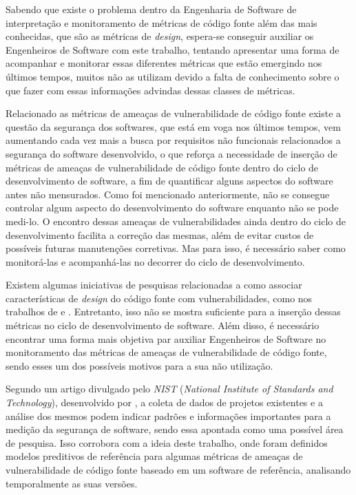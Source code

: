 Sabendo que existe o problema dentro da Engenharia de Software de interpretação
e monitoramento de métricas de código fonte além das mais conhecidas, que são 
as métricas de \textit{design}, espera-se conseguir auxiliar os 
Engenheiros de Software com este trabalho, tentando apresentar uma forma de
acompanhar e monitorar essas diferentes métricas que estão emergindo
nos últimos tempos, muitos não as utilizam devido a falta de conhecimento sobre
o que fazer com essas informações advindas dessas classes de métricas.

Relacionado as métricas de ameaças de vulnerabilidade de código fonte existe a
questão da segurança dos softwares, que está em voga nos últimos tempos,
vem aumentando cada vez mais a busca por requisitos não funcionais relacionados a
segurança do software desenvolvido, o que reforça a necessidade de inserção de
métricas de ameaças de vulnerabilidade de código fonte dentro do ciclo de
desenvolvimento de software, a fim de quantificar alguns aspectos do software
antes não mensurados. Como foi mencionado anteriormente, não se consegue
controlar algum aspecto do desenvolvimento do software enquanto não se pode
medi-lo. O encontro dessas ameaças de vulnerabilidades ainda dentro do ciclo de
desenvolvimento facilita a correção das mesmas, além de evitar custos de
possíveis futuras manutenções corretivas. Mas para isso, é necessário saber como
monitorá-las e acompanhá-las no decorrer do ciclo de desenvolvimento.

Existem algumas iniciativas de pesquisas relacionadas a como associar
características de \textit{design} do código fonte com vulnerabilidades, como
nos trabalhos de  e
. Entretanto, isso não se mostra suficiente para a
inserção dessas métricas no ciclo de desenvolvimento de software. Além disso, é
necessário encontrar uma forma mais objetiva par auxiliar Engenheiros de
Software no monitoramento das métricas de ameaças de vulnerabilidade de código
fonte, sendo esses um dos possíveis motivos para a sua não utilização.

Segundo um artigo divulgado pelo \textit{NIST} (\textit{National Institute of
Standards and Technology}), desenvolvido por , a coleta
de dados de projetos existentes e a análise dos mesmos podem indicar padrões e
informações importantes para a medição da segurança de software, sendo essa
apontada como uma possível área de pesquisa. Isso corrobora com a ideia deste
trabalho, onde foram definidos modelos preditivos de referência para algumas
métricas de ameaças de vulnerabilidade de código fonte baseado em um software de
referência, analisando temporalmente as suas versões.


